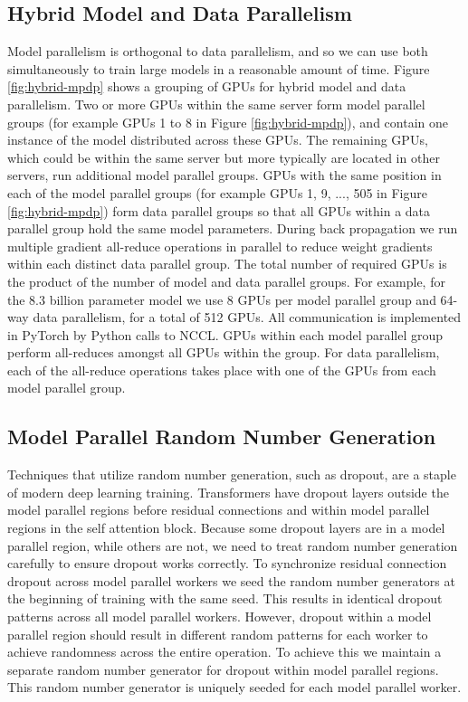 \documentclass{article}
\begin{document}
\subsection{Hybrid Model and Data Parallelism}
Model parallelism is orthogonal to data parallelism, and so we can use both simultaneously to train large models in a reasonable amount of time. Figure \ref{fig:hybrid-mpdp} shows a grouping of GPUs for hybrid model and data parallelism. Two or more GPUs within the same server form model parallel groups (for example GPUs 1 to 8 in Figure \ref{fig:hybrid-mpdp}), and contain one instance of the model distributed across these GPUs.  The remaining GPUs, which could be within the same server but more typically are located in other servers, run additional model parallel groups. GPUs with the same position in each of the model parallel groups (for example GPUs 1, 9, ..., 505 in Figure \ref{fig:hybrid-mpdp}) form data parallel groups so that all GPUs within a data parallel group hold the same model parameters. During back propagation we run multiple gradient all-reduce operations in parallel to reduce weight gradients within each distinct data parallel group. The total number of required GPUs is the product of the number of model and data parallel groups. For example, for the 8.3 billion parameter model we use 8 GPUs per model parallel group and 64-way data parallelism, for a total of 512 GPUs.  All communication is implemented in PyTorch by Python calls to NCCL.  GPUs within each model parallel group perform all-reduces amongst all GPUs within the group.  For data parallelism, each of the all-reduce operations takes place with one of the GPUs from each model parallel group.


\subsection{Model Parallel Random Number Generation}
Techniques that utilize random number generation, such as dropout, are a staple of modern deep learning training. Transformers have dropout layers outside the model parallel regions before residual connections and within model parallel regions in the self attention block. Because some dropout layers are in a model parallel region, while others are not, we need to treat random number generation carefully to ensure dropout works correctly. To synchronize residual connection dropout across model parallel workers we seed the random number generators at the beginning of training with the same seed. This results in identical dropout patterns across all model parallel workers. However, dropout within a model parallel region should result in different random patterns for each worker to achieve randomness across the entire operation. To achieve this we maintain a separate random number generator for dropout within model parallel regions. This random number generator is uniquely seeded for each model parallel worker.
\end{document}
